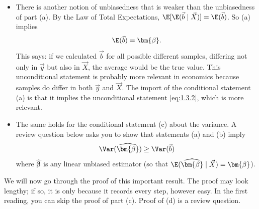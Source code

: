 \begin{itemize}
  \item There is another notion of unbiasedness that is weaker than the unbiasedness of
    part (a).  By the Law of Total Expectations,
    $\E[\E(\vec{b} \mid \vec{X})] = \E(\vec{b})$.  So (a) implies
    \begin{equation}
      \E(\vec{b}) = \bm{\beta}.
      \label{eq:1.3.2}
    \end{equation}
    This says: if we calculated $\vec{b}$ for all possible different samples, differing
    not only in $\vec{y}$ but also in $\vec{X}$, the average would be the true value.
    This unconditional statement is probably more relevant in economics because samples do
    differ in both $\vec{y}$ and $\vec{X}$.  The import of the conditional statement (a)
    is that it implies the unconditional statement \eqref{eq:1.3.2}, which is more
    relevant.

  \item The same holds for the conditional statement (c) about the variance.  A review
    question below asks you to show that statements (a) and (b) imply
    \begin{equation}
      \Var(\widehat{\bm{\beta}}) \geq \Var(\vec{b})
      \label{eq:1.3.3}
    \end{equation}
    where $\widehat{\bm{\beta}}$ is any linear unbiased estimator (so that
    $\E(\widehat{\bm{\beta}} \mid \vec{X}) = \bm{\beta}$).
\end{itemize}

We will now go through the proof of this important result.  The proof may look
lengthy; if so, it is only because it records every step, however easy.  In the first
reading, you can skip the proof of part (c).  Proof of (d) is a review question.

